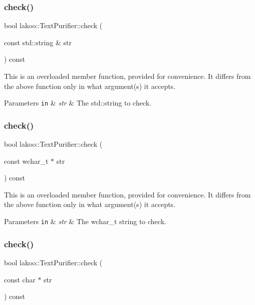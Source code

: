 \subsubsection{\texorpdfstring{check()}{check()}\hspace{0.1cm}{\footnotesize\ttfamily [2/4]}}
{\footnotesize\ttfamily bool lakoo\+::\+Text\+Purifier\+::check (\begin{DoxyParamCaption}\item[{const std\+::string \&}]{str }\end{DoxyParamCaption}) const}

This is an overloaded member function, provided for convenience. It differs from the above function only in what argument(s) it accepts. 
\begin{DoxyParams}[1]{Parameters}
\mbox{\tt in}  & {\em str} & The std\+::string to check. \\
\hline
\end{DoxyParams}
\mbox{\label{classlakoo_1_1_text_purifier_a866cf8a31c43496db79eac05b334dbf3}} 
\subsubsection{\texorpdfstring{check()}{check()}\hspace{0.1cm}{\footnotesize\ttfamily [3/4]}}
{\footnotesize\ttfamily bool lakoo\+::\+Text\+Purifier\+::check (\begin{DoxyParamCaption}\item[{const wchar\+\_\+t $\ast$}]{str }\end{DoxyParamCaption}) const}

This is an overloaded member function, provided for convenience. It differs from the above function only in what argument(s) it accepts. 
\begin{DoxyParams}[1]{Parameters}
\mbox{\tt in}  & {\em str} & The wchar\+\_\+t string to check. \\
\hline
\end{DoxyParams}
\mbox{\label{classlakoo_1_1_text_purifier_a2cf26b4a8fcb5cf8ea4b4598e56771dd}} 
\subsubsection{\texorpdfstring{check()}{check()}\hspace{0.1cm}{\footnotesize\ttfamily [4/4]}}
{\footnotesize\ttfamily bool lakoo\+::\+Text\+Purifier\+::check (\begin{DoxyParamCaption}\item[{const char $\ast$}]{str }\end{DoxyParamCaption}) const}

